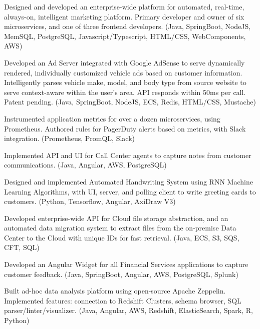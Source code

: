 \documentclass[letterpaper]{deedy-resume-openfont} %
\begin{document}
\begin{minipage}[t]{0.7\textwidth}
\sectionsep %


\begin{tightemize}
\item Designed and developed an enterprise-wide platform for automated, real-time, always-on, intelligent marketing platform. Primary developer and owner of six microservices, and one of three frontend developers. (Java, SpringBoot, NodeJS, MemSQL, PostgreSQL, Javascript/Typescript, HTML/CSS, WebComponents, AWS)
\item Developed an Ad Server integrated with Google AdSense to serve dynamically rendered, individually customized vehicle ads based on customer information. Intelligently parses vehicle make, model, and body type from source website to serve context-aware within the user's area. API responds within 50ms per call. Patent pending. (Java, SpringBoot, NodeJS, ECS, Redis, HTML/CSS, Mustache)
\item Instrumented application metrics for over a dozen microservices, using Prometheus. Authored rules for PagerDuty alerts based on metrics, with Slack integration. (Prometheus, PromQL, Slack) 
\item Implemented API and UI for Call Center agents to capture notes from customer communications. (Java, Angular, AWS, PostgreSQL)
\item Designed and implemented Automated Handwriting System using RNN Machine Learning Algorithms, with UI, server, and polling client to write greeting cards to customers. (Python, Tensorflow, Angular, AxiDraw V3)
\item Developed enterprise-wide API for Cloud file storage abstraction, and an automated data migration system to extract files from the on-premise Data Center to the Cloud with unique IDs for fast retrieval. (Java, ECS, S3, SQS, CFT, SQL)
\end{tightemize}

\sectionsep %


\begin{tightemize}
\item Developed an Angular Widget for all Financial Services applications to capture customer feedback. (Java, SpringBoot, Angular, AWS, PostgreSQL, Splunk)
\item Built ad-hoc data analysis platform using open-source Apache Zeppelin. Implemented features: connection to Redshift Clusters, schema browser, SQL parser/linter/visualizer. (Java, Angular, AWS, Redshift, ElasticSearch, Spark, R, Python)
\end{tightemize}


\end{minipage}
\end{document}
